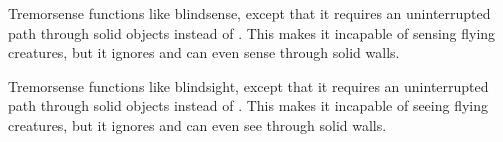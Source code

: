         Tremorsense functions like blindsense, except that it requires an uninterrupted path through solid objects instead of .
        This makes it incapable of sensing flying creatures, but it ignores  and can even sense through solid walls.

        Tremorsense functions like blindsight, except that it requires an uninterrupted path through solid objects instead of .
        This makes it incapable of seeing flying creatures, but it ignores  and can even see through solid walls.
